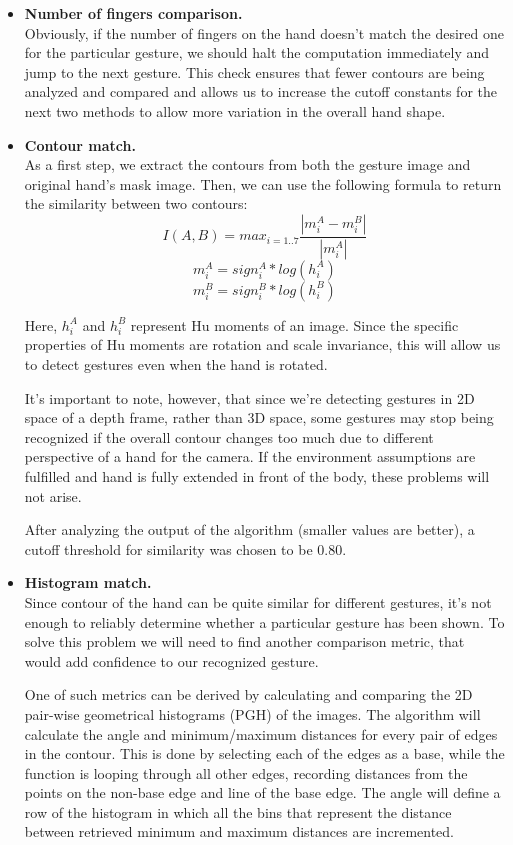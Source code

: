 \documentclass[a4paper,11pt,oneside]{article}
\begin{document}
\begin{itemize}
\item \textbf{Number of fingers comparison.}\\
Obviously, if the number of fingers on the hand doesn't match the desired one for the particular gesture, we should halt the computation immediately and jump to the next gesture. This check ensures that fewer contours are being analyzed and compared and allows us to increase the cutoff constants for the next two methods to allow more variation in the overall hand shape.\\

\item \textbf{Contour match.}\\
As a first step, we extract the contours from both the gesture image and original hand's mask image. Then, we can use the following formula to return the similarity between two contours:
\[ I(A,B) = max_{i=1..7} \frac{|m_i^A - m_i^B|}{|m_i^A|} \]
\[  m_i^A = sign_i^A * log (h_i^A) \]
\[  m_i^B = sign_i^B * log (h_i^B )\]

Here, $h_i^A$ and $h_i^B$ represent Hu moments of an image. Since the specific properties of Hu moments are rotation and scale invariance, this will allow us to detect gestures even when the hand is rotated.

It's important to note, however, that since we're detecting gestures in 2D space of a depth frame, rather than 3D space, some gestures may stop being recognized if the overall contour changes too much due to different perspective of a hand for the camera.  If the environment assumptions are fulfilled and hand is fully extended in front of the body, these problems will not arise.

After analyzing the output of the algorithm (smaller values are better), a cutoff threshold for similarity was chosen to be 0.80.\\

\item \textbf{Histogram match.}\\
Since contour of the hand can be quite similar for different gestures, it's not enough to reliably determine whether a particular gesture has been shown. To solve this problem we will need to find another comparison metric, that would add confidence to our recognized gesture.

One of such metrics can be derived by calculating and comparing the 2D pair-wise geometrical histograms (PGH) of the images. The algorithm will calculate the angle and minimum/maximum distances for every pair of edges in the contour. This is done by selecting each of the edges as a base, while the function is looping through all other edges, recording distances from the points on the non-base edge and line of the base edge. The angle will define a row of the histogram in which all the bins that represent the distance between retrieved minimum and maximum distances are incremented.


\end{itemize}
\end{document}
